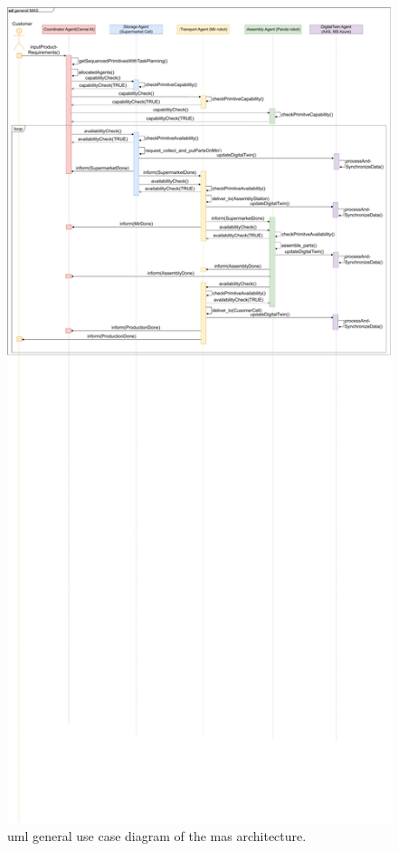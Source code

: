 \begin{figure}[htb]
    \centering
    \includegraphics[width=\textwidth]{figures/tests/usecase/SequenceUsecases.pdf}\hfill 
    \caption{\gls{uml} general use case diagram of the \gls{mas} architecture.} 
    \label{fig: sequence-diagram}
\end{figure}


